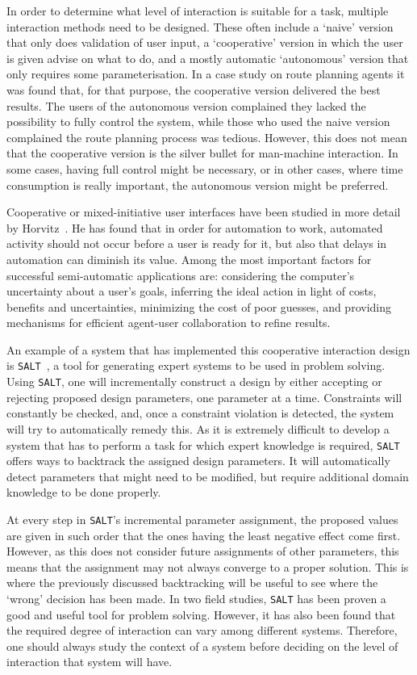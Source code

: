 In order to determine what level of interaction is suitable for a task, multiple interaction methods need to be designed. These often include a `naive' version that only does validation of user input, a `cooperative' version in which the user is given advise on what to do, and a mostly automatic `autonomous' version that only requires some parameterisation. In a case study on route planning agents it was found that, for that purpose, the cooperative version delivered the best results. The users of the autonomous version complained they lacked the possibility to fully control the system, while those who used the naive version complained the route planning process was tedious. However, this does not mean that the cooperative version is the silver bullet for man-machine interaction. In some cases, having full control might be necessary, or in other cases, where time consumption is really important, the autonomous version might be preferred.

Cooperative or mixed-initiative user interfaces have been studied in more detail by Horvitz~\cite{horvitz1999principles}. He has found that in order for automation to work, automated activity should not occur before a user is ready for it, but also that delays in automation can diminish its value. Among the most important factors for successful semi-automatic applications are: considering the computer's uncertainty about a user's goals, inferring the ideal action in light of costs, benefits and uncertainties, minimizing the cost of poor guesses, and providing mechanisms for efficient agent-user collaboration to refine results.

An example of a system that has implemented this cooperative interaction design is \verb|SALT|~\cite{marcus1987taking}, a tool for generating expert systems to be used in problem solving. Using \verb|SALT|, one will incrementally construct a design by either accepting or rejecting proposed design parameters, one parameter at a time. Constraints will constantly be checked, and, once a constraint violation is detected, the system will try to automatically remedy this. As it is extremely difficult to develop a system that has to perform a task for which expert knowledge is required, \verb|SALT| offers ways to backtrack the assigned design parameters. It will automatically detect parameters that might need to be modified, but require additional domain knowledge to be done properly.

At every step in \verb|SALT|'s incremental parameter assignment, the proposed values are given in such order that the ones having the least negative effect come first. However, as this does not consider future assignments of other parameters, this means that the assignment may not always converge to a proper solution. This is where the previously discussed backtracking will be useful to see where the `wrong' decision has been made. In two field studies, \verb|SALT| has been proven a good and useful tool for problem solving. However, it has also been found that the required degree of interaction can vary among different systems. Therefore, one should always study the context of a system before deciding on the level of interaction that system will have.

